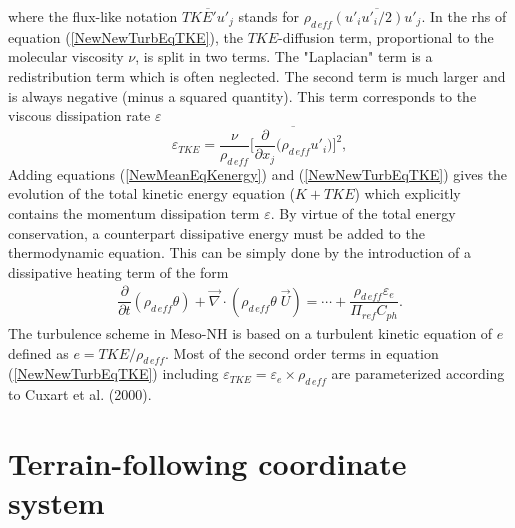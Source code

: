 \noindent where the flux-like notation $\overline{TKE' u'_j}$ stands for 
$\rho_{d\,eff} \overline{(u'_iu'_i/2) u'_j}$. In the rhs of equation 
(\ref{NewNewTurbEqTKE}), the $TKE$-diffusion term, proportional to the molecular
viscosity $\nu$, is split in two terms. The "Laplacian" term is a redistribution
term which is often neglected. The second term is much larger and is always 
negative (minus a squared quantity). This term corresponds to the viscous 
dissipation rate $\varepsilon$ 
\begin{equation}
\label{DissipationTerm}
\varepsilon_{TKE} = \dfrac{\nu}{\rho_{d\,eff}} \Big[ \overline{\dfrac{\partial}{\partial x_j} \Big( \rho_{d\,eff} u'_i\Big)} \Big]^2,
\end{equation}
Adding equations (\ref{NewMeanEqKenergy}) and (\ref{NewNewTurbEqTKE}) gives the
evolution of the total kinetic energy equation ($K + TKE$) which explicitly 
contains the momentum
dissipation term $\varepsilon$. By virtue of the total energy conservation, a
counterpart dissipative energy must be added to the thermodynamic equation. 
This can be simply done by the introduction of a dissipative heating term of
the form
\begin{eqnarray}
\label{NewThequa}
\dfrac{\partial}{\partial t}(\rho_{d\,eff} \theta)  + \vec{ \nabla} \cdot
(\rho_{d\,eff} \theta \;\vec{U})
= 
\cdots + \dfrac{\rho_{d\,eff} \varepsilon_{e}}{\Pi_{ref} C_{ph}}.
\end{eqnarray}
The turbulence scheme in Meso-NH is based on a turbulent kinetic
equation of $e$ defined as $e=TKE/\rho_{d\,eff}$. Most of the second order 
terms in equation (\ref{NewNewTurbEqTKE}) including 
$\varepsilon_{TKE}= \varepsilon_{e}\times \rho_{d\,eff}$ are parameterized 
according to Cuxart et al. (2000).

\section{Terrain-following coordinate system}

